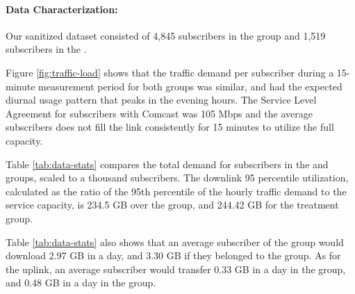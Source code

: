 

\paragraph{Data Characterization: }Our sanitized dataset consisted of 4,845 
subscribers in the \control{} group and 1,519 subscribers in the \treatment{}. 

Figure \ref{fig:traffic-load} shows that the traffic demand per subscriber during
a 15-minute measurement period for both groups was similar, and had the
expected diurnal usage pattern that peaks in the evening hours.
The Service Level Agreement for subscribers with Comcast was 105 Mbps
and the average subscribers does not fill the link consistently
for 15 minutes to utilize the full capacity.

Table \ref{tab:data-stats} compares the total demand for subscribers
in the \control{} and \treatment{} groups, scaled to a thousand subscribers.
The downlink 95 percentile utilization, calculated as the ratio of the 95th 
percentile of the hourly traffic demand to the service capacity, is 234.5 GB 
over the \control{} group, and 244.42 GB for the treatment group.

Table \ref{tab:data-stats} also shows that an average subscriber of the \control{}
group would download 2.97 GB in a day, and 3.30 GB if they belonged to the \treatment{}
group. As for the uplink, an average subscriber would transfer 0.33 GB in a day in the
\control{} group, and 0.48 GB in a day in the \treatment{} group.


